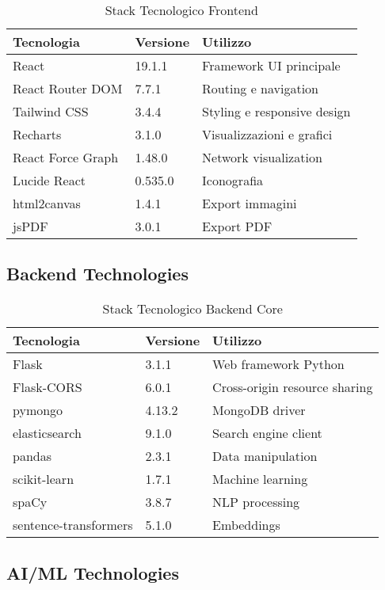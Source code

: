 \documentclass[12pt,a4paper]{report}
\begin{document}
\begin{table}[H]
\centering
\begin{tabular}{@{}lll@{}}
\toprule
\textbf{Tecnologia} & \textbf{Versione} & \textbf{Utilizzo} \\
\midrule
React & 19.1.1 & Framework UI principale \\
React Router DOM & 7.7.1 & Routing e navigation \\
Tailwind CSS & 3.4.4 & Styling e responsive design \\
Recharts & 3.1.0 & Visualizzazioni e grafici \\
React Force Graph & 1.48.0 & Network visualization \\
Lucide React & 0.535.0 & Iconografia \\
html2canvas & 1.4.1 & Export immagini \\
jsPDF & 3.0.1 & Export PDF \\
\bottomrule
\end{tabular}
\caption{Stack Tecnologico Frontend}
\label{tab:frontend-stack}
\end{table}

\subsection{Backend Technologies}

\begin{table}[H]
\centering
\begin{tabular}{@{}lll@{}}
\toprule
\textbf{Tecnologia} & \textbf{Versione} & \textbf{Utilizzo} \\
\midrule
Flask & 3.1.1 & Web framework Python \\
Flask-CORS & 6.0.1 & Cross-origin resource sharing \\
pymongo & 4.13.2 & MongoDB driver \\
elasticsearch & 9.1.0 & Search engine client \\
pandas & 2.3.1 & Data manipulation \\
scikit-learn & 1.7.1 & Machine learning \\
spaCy & 3.8.7 & NLP processing \\
sentence-transformers & 5.1.0 & Embeddings \\
\bottomrule
\end{tabular}
\caption{Stack Tecnologico Backend Core}
\label{tab:backend-stack}
\end{table}

\subsection{AI/ML Technologies}
\end{document}
